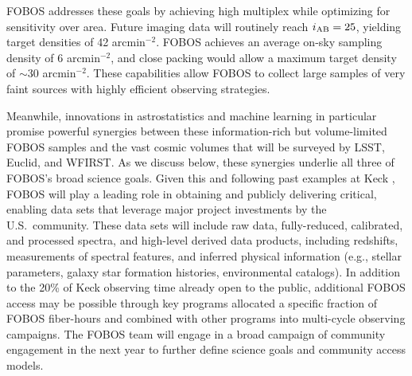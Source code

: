 FOBOS addresses these goals by achieving high multiplex while optimizing for sensitivity over area.  Future imaging
data will routinely reach $i_{\rm AB} = 25$, yielding target densities of 42 arcmin$^{-2}$.  FOBOS achieves an average
on-sky sampling density of 6 arcmin$^{-2}$, and close packing would allow a maximum target density of $\sim$30
arcmin$^{-2}$.  These capabilities allow FOBOS to collect large samples of very faint sources with highly efficient
observing strategies.

Meanwhile, innovations in astrostatistics and machine learning in particular promise powerful synergies between these
information-rich but volume-limited FOBOS samples and the vast cosmic volumes that will be surveyed by LSST, Euclid,
and WFIRST.  As we discuss below, these synergies underlie all three of FOBOS's broad science goals.  Given this and
following past examples at Keck \citep[e.g., DEEP2][]{newman13}, FOBOS will play a leading role in obtaining and
publicly delivering critical, enabling data sets that leverage major project investments by the U.S.~community.  These
data sets will include raw data, fully-reduced, calibrated, and processed spectra, and high-level derived data
products, including redshifts, measurements of spectral features, and inferred physical information (e.g., stellar
parameters, galaxy star formation histories, environmental catalogs).  In addition to the 20\% of Keck observing time
already open to the public, additional FOBOS access may be possible through key programs allocated a specific fraction
of FOBOS fiber-hours and combined with other programs into multi-cycle observing campaigns.  The FOBOS team will engage in a broad campaign of community engagement in the next year to further define science goals and community access models.


